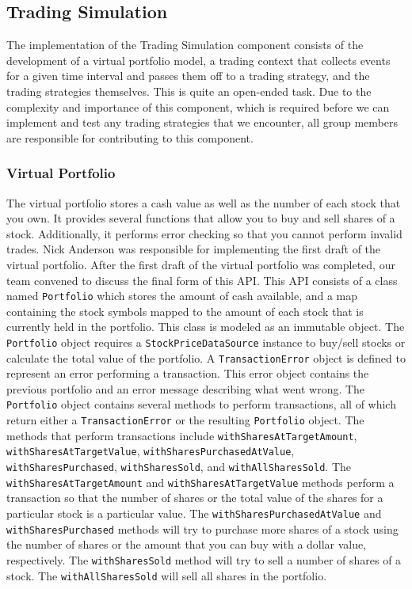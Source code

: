\subsection{Trading Simulation}

The implementation of the Trading Simulation component consists of the development of a virtual portfolio model, a trading context that collects events for a given time interval and passes them off to a trading strategy, and the trading strategies themselves.
This is quite an open-ended task.
Due to the complexity and importance of this component, which is required before we can implement and test any trading strategies that we encounter, all group members are responsible for contributing to this component.

\subsubsection{Virtual Portfolio}

The virtual portfolio stores a cash value as well as the number of each stock that you own.
It provides several functions that allow you to buy and sell shares of a stock.
Additionally, it performs error checking so that you cannot perform invalid trades.
Nick Anderson was responsible for implementing the first draft of the virtual portfolio.
After the first draft of the virtual portfolio was completed, our team convened to discuss the final form of this API.
This API consists of a class named \texttt{Portfolio} which stores the amount of cash available, and a map containing the stock symbols mapped to the amount of each stock that is currently held in the portfolio.
This class is modeled as an immutable object.
The \texttt{Portfolio} object requires a \texttt{StockPriceDataSource} instance to buy/sell stocks or calculate the total value of the portfolio.
A \texttt{TransactionError} object is defined to represent an error performing a transaction.
This error object contains the previous portfolio and an error message describing what went wrong.
The \texttt{Portfolio} object contains several methods to perform transactions, all of which return either a \texttt{TransactionError} or the resulting \texttt{Portfolio} object.
The methods that perform transactions include \texttt{withSharesAtTargetAmount}, \texttt{withSharesAtTargetValue}, \texttt{withSharesPurchasedAtValue}, \texttt{withSharesPurchased}, \texttt{withSharesSold}, and \texttt{withAllSharesSold}.
The \texttt{withSharesAtTargetAmount} and \texttt{withSharesAtTargetValue} methods perform a transaction so that the number of shares or the total value of the shares for a particular stock is a particular value.
The \texttt{withSharesPurchasedAtValue} and \texttt{withSharesPurchased} methods will try to purchase more shares of a stock using the number of shares or the amount that you can buy with a dollar value, respectively.
The \texttt{withSharesSold} method will try to sell a number of shares of a stock.
The \texttt{withAllSharesSold} will sell all shares in the portfolio.
 
